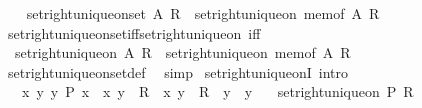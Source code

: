 \begin{isabellebody}
\ \ \isamarkupfalse%
\ {\isachardoublequoteopen}set{\isacharunderscore}{\kern0pt}right{\isacharunderscore}{\kern0pt}unique{\isacharunderscore}{\kern0pt}on{\isacharunderscore}{\kern0pt}set\ A\ R\ {\isasymequiv}\ set{\isacharunderscore}{\kern0pt}right{\isacharunderscore}{\kern0pt}unique{\isacharunderscore}{\kern0pt}on\ {\isacharparenleft}{\kern0pt}mem{\isacharunderscore}{\kern0pt}of\ A{\isacharparenright}{\kern0pt}\ R{\isachardoublequoteclose}\isanewline
{}\isamarkupfalse%
\isanewline
\isanewline
{}\isamarkupfalse%
\ set{\isacharunderscore}{\kern0pt}right{\isacharunderscore}{\kern0pt}unique{\isacharunderscore}{\kern0pt}on{\isacharunderscore}{\kern0pt}set{\isacharunderscore}{\kern0pt}iff{\isacharunderscore}{\kern0pt}set{\isacharunderscore}{\kern0pt}right{\isacharunderscore}{\kern0pt}unique{\isacharunderscore}{\kern0pt}on\ {\isacharbrackleft}{\kern0pt}iff{\isacharbrackright}{\kern0pt}{\isacharcolon}{\kern0pt}\isanewline
\ \ {\isachardoublequoteopen}set{\isacharunderscore}{\kern0pt}right{\isacharunderscore}{\kern0pt}unique{\isacharunderscore}{\kern0pt}on\ A\ R\ {\isasymlongleftrightarrow}\ set{\isacharunderscore}{\kern0pt}right{\isacharunderscore}{\kern0pt}unique{\isacharunderscore}{\kern0pt}on\ {\isacharparenleft}{\kern0pt}mem{\isacharunderscore}{\kern0pt}of\ A{\isacharparenright}{\kern0pt}\ R{\isachardoublequoteclose}\isanewline
%
\isadelimproof
\ \ %
\endisadelimproof
%
\isatagproof
{}\isamarkupfalse%
\ set{\isacharunderscore}{\kern0pt}right{\isacharunderscore}{\kern0pt}unique{\isacharunderscore}{\kern0pt}on{\isacharunderscore}{\kern0pt}set{\isacharunderscore}{\kern0pt}def\ \isamarkupfalse%
\ simp%
\endisatagproof
{\isafoldproof}%
%
\isadelimproof
\isanewline
%
\endisadelimproof
\isanewline
{}\isamarkupfalse%
\ set{\isacharunderscore}{\kern0pt}right{\isacharunderscore}{\kern0pt}unique{\isacharunderscore}{\kern0pt}onI\ {\isacharbrackleft}{\kern0pt}intro{\isacharbrackright}{\kern0pt}{\isacharcolon}{\kern0pt}\isanewline
\ \ \ {\isachardoublequoteopen}{\isasymAnd}x\ y\ y{\isacharprime}{\kern0pt}{\isachardot}{\kern0pt}\ P\ x\ {\isasymLongrightarrow}\ {\isasymlangle}x{\isacharcomma}{\kern0pt}\ y{\isasymrangle}\ {\isasymin}\ R\ {\isasymLongrightarrow}\ {\isasymlangle}x{\isacharcomma}{\kern0pt}\ y{\isacharprime}{\kern0pt}{\isasymrangle}\ {\isasymin}\ R\ {\isasymLongrightarrow}\ y\ {\isacharequal}{\kern0pt}\ y{\isacharprime}{\kern0pt}{\isachardoublequoteclose}\isanewline
\ \ \ {\isachardoublequoteopen}set{\isacharunderscore}{\kern0pt}right{\isacharunderscore}{\kern0pt}unique{\isacharunderscore}{\kern0pt}on\ P\ R{\isachardoublequoteclose}\isanewline

\end{isabellebody}
